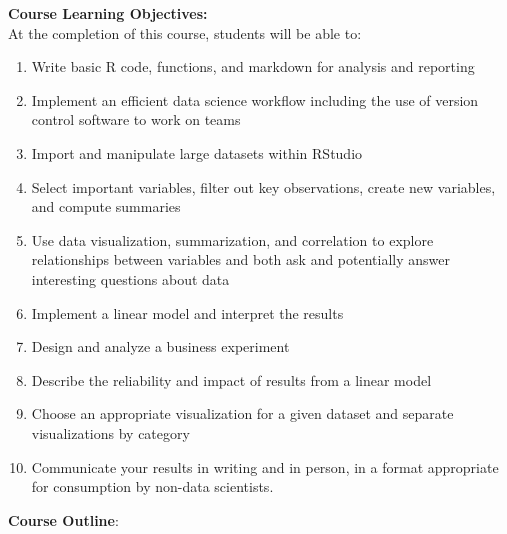\documentclass[11pt]{article}
\begin{document}
\textbf {\large Course Learning Objectives:} \\
At the completion of this course, students will be able to:
{\footnotesize
\begin{enumerate} 
	\item Write basic R code, functions, and markdown for analysis and reporting
	\item Implement an efficient data science workflow including the use of version control software to work on teams
	\item Import and manipulate large datasets within RStudio
	\item Select important variables, filter out key observations, create new variables, and compute summaries
	\item Use data visualization, summarization, and correlation to explore relationships between variables and both ask and potentially answer interesting questions about data
	\item Implement a linear model and interpret the results
	\item Design and analyze a business experiment
	\item Describe the reliability and impact of results from a linear model
	\item Choose an appropriate visualization for a given dataset and separate visualizations by category
	\item Communicate your results in writing and in person, in a format appropriate for consumption by non-data scientists.
\end{enumerate}
}
\textbf {\large Course Outline}:
\end{document}
